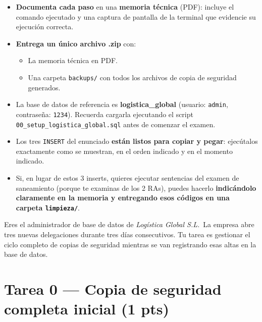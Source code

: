 \documentclass[a4paper,11pt]{article}
\begin{document}
\begin{Form}
\begin{tcolorbox}[colframe=alert, title=INSTRUCCIONES Y ENTREGABLES]
\begin{itemize}[nosep]
    \item \textbf{Documenta cada paso} en una \textbf{memoria técnica} (PDF): incluye el comando ejecutado y una captura de pantalla de la terminal que evidencie su ejecución correcta.
    \item \textbf{Entrega un único archivo .zip} con:
        \begin{itemize}[nosep]
            \item La memoria técnica en PDF.
            \item Una carpeta \texttt{backups/} con todos los archivos de copia de seguridad generados.
        \end{itemize}
    \item La base de datos de referencia es \textbf{logistica\_global} (usuario: \texttt{admin}, contraseña: \texttt{1234}). Recuerda cargarla ejecutando el script \texttt{00\_setup\_logistica\_global.sql} antes de comenzar el examen.
    \item Los tres \texttt{INSERT} del enunciado \textbf{están listos para copiar y pegar}: ejecútalos exactamente como se muestran, en el orden indicado y en el momento indicado.
    \item Si, en lugar de estos 3 inserts, quieres ejecutar sentencias del examen de saneamiento (porque te examinas de los 2 RAs), puedes hacerlo \textbf{indicándolo claramente en la memoria y entregando esos códigos en una carpeta \texttt{limpieza/}}.
\end{itemize}
\end{tcolorbox}

\vspace{0.4cm}

\begin{tcolorbox}[title=Contexto del escenario]
Eres el administrador de base de datos de \textit{Logística Global S.L.}\ La empresa abre tres nuevas delegaciones durante tres días consecutivos. Tu tarea es gestionar el ciclo completo de copias de seguridad mientras se van registrando esas altas en la base de datos.
\end{tcolorbox}

\vspace{0.4cm}

\section{Tarea 0 — Copia de seguridad completa inicial \textnormal{(1 pts)}}


\end{Form}
\end{document}
